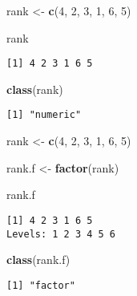 \documentclass[]{book}
\newenvironment{Shaded}{\begin{snugshade}}{\end{snugshade}}
\newcommand{\KeywordTok}[1]{\textcolor[rgb]{0.13,0.29,0.53}{\textbf{#1}}}
\newcommand{\DecValTok}[1]{\textcolor[rgb]{0.00,0.00,0.81}{#1}}
\newcommand{\StringTok}[1]{\textcolor[rgb]{0.31,0.60,0.02}{#1}}
\newcommand{\NormalTok}[1]{#1}
\theoremstyle{definition}
\theoremstyle{definition}
\theoremstyle{definition}
\theoremstyle{remark}
\begin{document}
\begin{Shaded}
\begin{Highlighting}[]
\NormalTok{rank <-}\StringTok{ }\KeywordTok{c}\NormalTok{(}\DecValTok{4}\NormalTok{, }\DecValTok{2}\NormalTok{, }\DecValTok{3}\NormalTok{, }\DecValTok{1}\NormalTok{, }\DecValTok{6}\NormalTok{, }\DecValTok{5}\NormalTok{)}

\NormalTok{rank}
\end{Highlighting}
\end{Shaded}

\begin{verbatim}
[1] 4 2 3 1 6 5
\end{verbatim}

\begin{Shaded}
\begin{Highlighting}[]
\KeywordTok{class}\NormalTok{(rank)}
\end{Highlighting}
\end{Shaded}

\begin{verbatim}
[1] "numeric"
\end{verbatim}

\begin{Shaded}
\begin{Highlighting}[]
\NormalTok{rank <-}\StringTok{ }\KeywordTok{c}\NormalTok{(}\DecValTok{4}\NormalTok{, }\DecValTok{2}\NormalTok{, }\DecValTok{3}\NormalTok{, }\DecValTok{1}\NormalTok{, }\DecValTok{6}\NormalTok{, }\DecValTok{5}\NormalTok{)}

\NormalTok{rank.f <-}\StringTok{ }\KeywordTok{factor}\NormalTok{(rank)}

\NormalTok{rank.f}
\end{Highlighting}
\end{Shaded}

\begin{verbatim}
[1] 4 2 3 1 6 5
Levels: 1 2 3 4 5 6
\end{verbatim}

\begin{Shaded}
\begin{Highlighting}[]
\KeywordTok{class}\NormalTok{(rank.f)}
\end{Highlighting}
\end{Shaded}

\begin{verbatim}
[1] "factor"
\end{verbatim}
\end{document}
